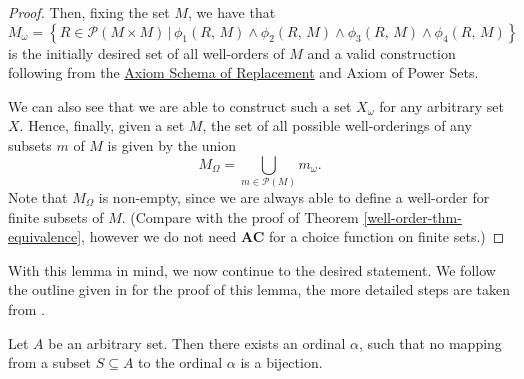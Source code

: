 \documentclass[../../main.tex]{subfiles}
\begin{document}
\begin{proof}
    Then, fixing the set $M$, we have that
    $$M_\omega = \left\{R \in \mathcal{P}(M \times M) \,\vert\, \phi_1(R,\, M) \wedge \phi_2(R,\, M) \wedge \phi_3(R,\, M) \wedge \phi_4(R,\, M)\right\}$$
    is the initially desired set of all well-orders of $M$ and a valid construction following from the \hyperref[ZF3]{Axiom Schema of Replacement} and Axiom of Power Sets.
    
    We can also see that we are able to construct such a set $X_\omega$ for any arbitrary set $X$.
    Hence, finally, given a set $M$, the set of all possible well-orderings of any subsets $m$ of $M$ is given by the union
    $$M_\Omega = \bigcup_{m \in \mathcal{P}(M)} m_\omega.$$
    Note that $M_\Omega$ is non-empty, since we are always able to define a well-order for finite subsets of $M$. 
    (Compare with the proof of Theorem \ref{well-order-thm-equivalence}, however we do not need \textbf{AC} for a choice function on finite sets.)
\end{proof}

With this lemma in mind, we now continue to the desired statement.
We follow the outline given in \cite{Haj72} for the proof of this lemma, the more detailed steps are taken from \cite{Har15}.

\begin{lemma}\label{hartogs-lemma}\cite{Har15}\cite[Lemma]{Haj72}
    Let $A$ be an arbitrary set.
    Then there exists an ordinal $\alpha$, such that no mapping from a subset $S \subseteq A$ to the ordinal $\alpha$ is a bijection.
\end{lemma}
\end{document}
